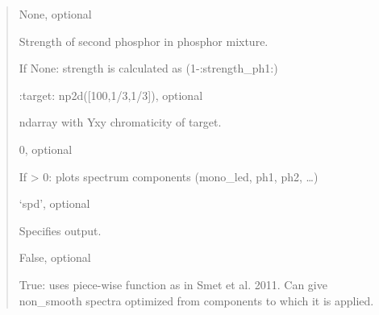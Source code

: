 \documentclass[letterpaper,10pt,english]{sphinxmanual}
\begin{document}
\begin{fulllineitems}
\begin{description}
\begin{quote}
\begin{description}
\item[{strength\_ph2}] \leavevmode
\begin{DUlineblock}{0em}
\item[] None, optional
\item[] Strength of second phosphor in phosphor mixture. 
\item[] If None: strength is calculated as (1-:strength\_ph1:)
\item[]
\begin{DUlineblock}{\DUlineblockindent}
\item[]
\begin{DUlineblock}{\DUlineblockindent}
\item[] :target: np2d({[}100,1/3,1/3{]}), optional
\end{DUlineblock}
\item[] ndarray with Yxy chromaticity of target.
\end{DUlineblock}
\end{DUlineblock}

\item[{verbosity}] \leavevmode
\begin{DUlineblock}{0em}
\item[] 0, optional
\item[] If \textgreater{} 0: plots spectrum components (mono\_led, ph1, ph2, …)
\end{DUlineblock}

\item[{out}] \leavevmode
\begin{DUlineblock}{0em}
\item[] ‘spd’, optional
\item[] Specifies output.
\end{DUlineblock}

\item[{use\_piecewise\_fcn}] \leavevmode
\begin{DUlineblock}{0em}
\item[] False, optional
\item[] True: uses piece-wise function as in Smet et al. 2011. Can give 
non\_smooth spectra optimized from components to which it is
applied. 
\end{DUlineblock}


\end{description}
\end{quote}
\end{description}
\end{fulllineitems}
\end{document}
